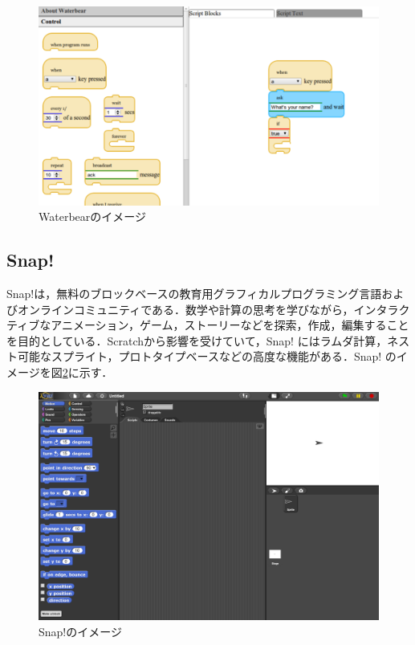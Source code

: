 \documentclass{risepaper}
\begin{document}
\begin{figure}[h]
\begin{center}
\includegraphics[scale=0.5]{img/waterbear.png}
\caption{Waterbearのイメージ}%
\label{fig:waterbear}
\end{center}%
\end{figure}%

	\subsection{Snap!}

Snap!\cite{snap}は，無料のブロックベースの教育用グラフィカルプログラミング言語およびオンラインコミュニティである．数学や計算の思考を学びながら，インタラクティブなアニメーション，ゲーム，ストーリーなどを探索，作成，編集することを目的としている．Scratchから影響を受けていて，Snap! にはラムダ計算，ネスト可能なスプライト，プロトタイプベースなどの高度な機能がある．Snap! のイメージを図\ref{fig:snap}に示す． 

\begin{figure}[h]
\begin{center}
\includegraphics[scale=0.5]{img/snap.png}
\caption{Snap!のイメージ}%
\label{fig:snap}
\end{center}%
\end{figure}%
\end{document}

